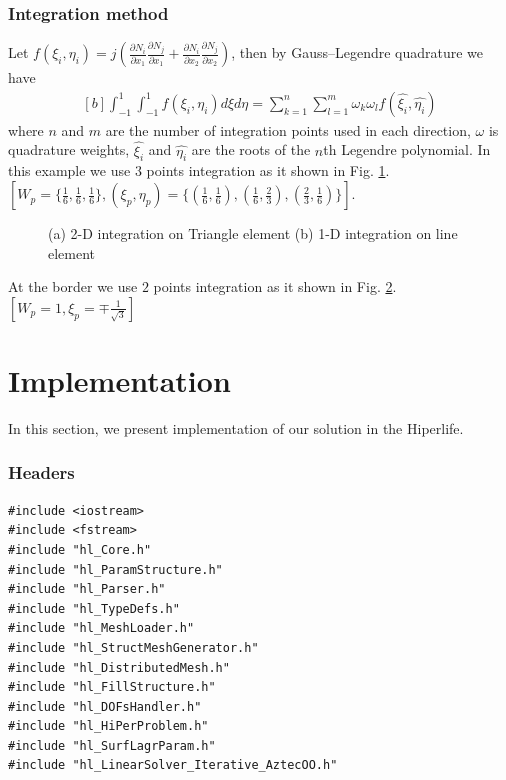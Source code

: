 \documentclass[]{article}
\begin{document}
\subsubsection{Integration method} \label{sec: int}
Let $f(\xi_{i},\eta_{i})=j(\frac{\partial N_{i}}{\partial x_{1}}
\frac{\partial N_{j}}{\partial x_{1}}+\frac{\partial N_{i}}{\partial x_{2}} 
\frac{\partial N_{j}}{\partial x_{2}})$, then by Gauss–Legendre quadrature we have
\begin{equation}\label{eq20}
	\begin{aligned}[b]
		\int_{-1}^1 \int_{-1}^1 f(\xi_{i},\eta_{i}) d\xi d\eta = \sum_{k=1}^{n}\sum_{l=1}^{m} \omega_{k}\omega_{l}f(\hat{\xi_{i}},\hat{\eta_{i}})
	\end{aligned}
\end{equation}
where $n$ and $m$ are the number of integration points used in each direction, $\omega$ is quadrature weights, $\hat{\xi_{i}}$ and $\hat{\eta_{i}}$ are the roots of the $n$th Legendre polynomial. In this example we use $3$ points integration as it shown in Fig. \ref{fig:ifig1}. $[W_{p}=\{\frac{1}{6}, \frac{1}{6},\frac{1}{6} \}, (\xi_{p}, \eta_{p})=\{(\frac{1}{6},\frac{1}{6}), (\frac{1}{6},\frac{2}{3}),  (\frac{2}{3},\frac{1}{6})\}]$.
\begin{figure}
	\begin{subfigure}{.5\textwidth}
		\centering
		
		\caption{}
		\label{fig:ifig1}
	\end{subfigure}%
	\begin{subfigure}{.5\textwidth}
		\centering
		
		\caption{}
		\label{fig:ifig2}
	\end{subfigure}
	\caption{(a) 2-D integration on Triangle element (b) 1-D integration on line element}
	\label{fig:int}
\end{figure}
At the border we use $2$ points integration as it shown in Fig. \ref{fig:ifig2}. $[W_{p}=1, \xi_{p}=\mp \frac{1}{\sqrt{3}}]$

\section{Implementation} \label{sec: imp}
In this section, we present implementation of our solution in the Hiperlife.
\nolinenumbers
\subsubsection{Headers} \label{sec: hdr}
\begin{lstlisting}
#include <iostream>
#include <fstream>
#include "hl_Core.h"
#include "hl_ParamStructure.h"
#include "hl_Parser.h"
#include "hl_TypeDefs.h"
#include "hl_MeshLoader.h"
#include "hl_StructMeshGenerator.h"
#include "hl_DistributedMesh.h"
#include "hl_FillStructure.h"
#include "hl_DOFsHandler.h"
#include "hl_HiPerProblem.h"
#include "hl_SurfLagrParam.h"
#include "hl_LinearSolver_Iterative_AztecOO.h"
\end{lstlisting}
\end{document}

